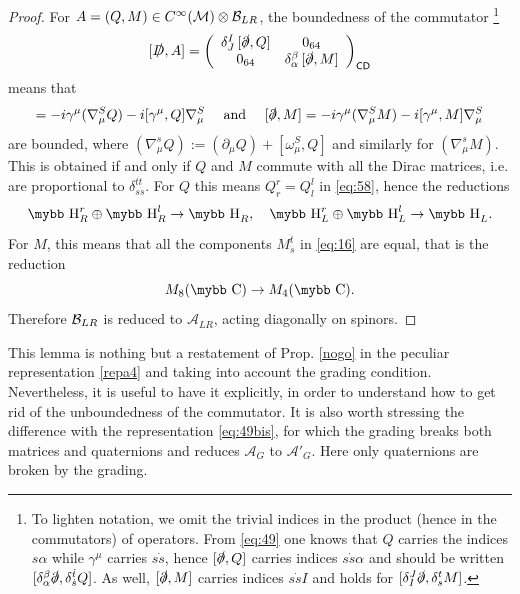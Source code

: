 \documentclass[11pt]{article}
\newcommand{\cinf}{{C^\infty({\cal M})}}
\newcommand{\A}{\mathcal A}
\newcommand{\ds}{\slashed \partial}
\def\bb#1{\hbox{\mybb#1}}
\newcommand{\del}{\partial}
\newcommand{\partind}[1]{{\sf #1}}
\begin{document}
\begin{proof}
For $A=(Q, M)\in \cinf\otimes{\cal B}_{LR}$, the boundedness of the commutator
{\footnote{\label{footnotenotations}To lighten notation, we omit the trivial indices in the
    product (hence in the commutators) of operators. From
    \eqref{eq:49} one knows that $Q$ carries the indices
    $s\alpha$ while $\gamma^\mu$ carries $s\dot s$, hence
    $[\slashed \del, Q]$ carries indices $s\dot s\alpha$ and should be
    written $[\delta_\alpha^\beta\slashed\del,  \delta_{\dot s}^{\dot t} Q]$.
As well, $[\slashed \del, M]$ carries indices $s\dot s I$ and holds for $[\delta_I^J\slashed \del, \delta_{s}^{t} M]$.}}
\begin{equation}
\label{eq:41}
   [\slashed D, A] =\left(
\begin{array}{cc}
 \delta^I_J \,[\slashed\del,  Q]&0_{64} \\ 
 0_{64} &\delta_\alpha^\beta\, [\slashed \del, M]
\end{array}
\right)_{\partind{CD}}
 \end{equation}
means that 
\begin{equation}
[\ds, Q] = -i\gamma^\mu (\nabla_\mu^S Q)  -i [\gamma^\mu, Q]\nabla_\mu^S \quad\text{ and }\quad
[\ds, M] = -i\gamma^\mu (\nabla_\mu^S M) -i[\gamma^\mu, M]\nabla^S_\mu
\label{eq:137}
\end{equation}
are
bounded, where $(\nabla_\mu^s Q):= (\del_\mu Q) + [\omega_\mu^S, Q]$ and
similarly for  $(\nabla_\mu^s M)$. This is obtained if and only if $Q$ and $M$ commute with all the Dirac
matrices, i.e. are proportional to $\delta_{s\dot s }^{t\dot t}$. For $Q$ this means 
$Q_r^r = Q_l^l$ in \eqref{eq:58}, hence the reductions
\begin{equation}
\bb H^r_R \oplus \bb H^l_R\to \bb H_R, \quad \bb H^r_L \oplus \bb H^l_L \to
\bb H_L.
\label{eq:94}
\end{equation}
For $M$, this means that all the components $M_{\dot s}^{\dot t}$ in
\eqref{eq:16} are equal, that is the reduction
\begin{equation}
\label{reduc}
M_8(\bb
C)\to M_4(\bb C).
\end{equation}
Therefore ${\cal B}_{LR}$ is reduced to $\A_{LR}$, acting diagonally on spinors.
\end{proof}
\noindent This lemma is nothing but a restatement of  Prop. \ref{nogo} in
the peculiar representation \eqref{repa4} and taking into account the
grading condition. Nevertheless, it is useful to have it explicitly, in
order to understand how to get rid of the unboundedness of the commutator.
It is also worth stressing the difference with the representation
\eqref{eq:49bis}, for which the grading breaks both matrices and
quaternions and reduces $\A_G$ to $\A'_G$. Here only quaternions are
broken by the grading.
\end{document}
